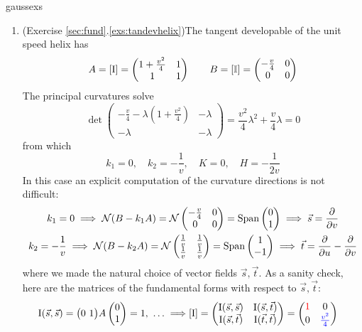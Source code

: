 \begin{examples}{}{gaussexs}
\begin{enumerate}
		\item\label{ex:tandevgauss} (Exercise \ref*{sec:fund}.\ref{exs:tandevhelix})\lstsp The tangent developable of the unit speed helix has	
	  \[
	  	A=[\mathrm{I}]=
	  	\begin{pmatrix}
	  		1+\tfrac{v^2}{4}&1\\
	  		1&1
	  	\end{pmatrix}
	  	\qquad
	  	B=[\mathbb{I}]=
	  	\begin{pmatrix}
	  		-\tfrac{v}{4}&0\\
	  		0&0
	  	\end{pmatrix}
	  \]
	  The principal curvatures solve
	  \[
	  	\det
	  	\begin{pmatrix}
	  		-\frac v4-\lambda\left(1+\frac{v^2}4\right)&-\lambda\\
	  		-\lambda&-\lambda
	  	\end{pmatrix}
	  	=\frac{v^2}4\lambda^2+\frac v4\lambda=0
	  \]
	  from which 
	  \[
	  	k_1=0,\quad k_2=-\frac 1v,\quad K=0,\quad H=-\frac 1{2v}
	  \]
	  In this case an explicit computation of the curvature directions is not difficult:
	  \begin{gather*}
	  	k_1=0\implies \mathcal{N}(B-k_1A)=\mathcal{N}
	  	\begin{pmatrix}
	  		-\frac v4&0\\
	  		0&0
	  	\end{pmatrix}
	  	=\operatorname{Span}\begin{pmatrix}0\\1\end{pmatrix}\implies \vec s=\frac{\partial }{\partial v}\\
	  	k_2=-\frac 1v\implies \mathcal{N}(B-k_2A)=\mathcal{N}
	  	\begin{pmatrix}
				\frac 1v&\frac 1v\\
	  		\frac 1v&\frac 1v
	  	\end{pmatrix}
	  	=\operatorname{Span}\begin{pmatrix}1\\-1\end{pmatrix} \implies \vec t=\frac{\partial }{\partial u}-\frac{\partial }{\partial v}
	  \end{gather*}
	  where we made the natural choice of vector fields $\vec s,\vec t$. As a sanity check, here are the matrices of the fundamental forms with respect to $\vec s,\vec t$:
	  \begin{align*}
	  	\I(\vec s,\vec s)=\bigl(0\ 1\bigr)A\twovec 01=1,\ \ldots \implies
	  	&[\I]=
	  	\begin{pmatrix}
	  		\I(\vec s,\vec s)&\I(\vec s,\vec t)\\
	  		\I(\vec s,\vec t)&\I(\vec t,\vec t)
			\end{pmatrix}
			=
			\begin{pmatrix}
	  		\textcolor{red}{1}&0\\
	  		0&\textcolor{blue}{\frac{v^2}4}
	  	\end{pmatrix}

\end{align*}
\end{enumerate}
\end{examples}
